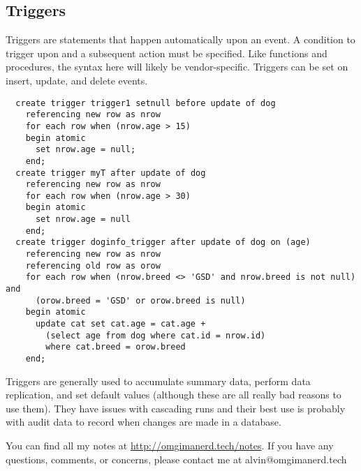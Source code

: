 \documentclass{math}
\begin{document}
\subsection*{Triggers}
Triggers are statements that happen automatically upon an event. A condition to
trigger upon and a subsequent action must be specified. Like functions and
procedures, the syntax here will likely be vendor-specific. Triggers can be set
on insert, update, and delete events.
\begin{lstlisting}
  create trigger trigger1 setnull before update of dog
    referencing new row as nrow
    for each row when (nrow.age > 15)
    begin atomic
      set nrow.age = null;
    end;
  create trigger myT after update of dog
    referencing new row as nrow
    for each row when (nrow.age > 30)
    begin atomic
      set nrow.age = null
    end;
  create trigger doginfo_trigger after update of dog on (age)
    referencing new row as nrow
    referencing old row as orow
    for each row when (nrow.breed <> 'GSD' and nrow.breed is not null) and
      (orow.breed = 'GSD' or orow.breed is null)
    begin atomic
      update cat set cat.age = cat.age +
        (select age from dog where cat.id = nrow.id)
        where cat.breed = orow.breed
    end;
\end{lstlisting}
Triggers are generally used to accumulate summary data, perform data
replication, and set default values (although these are all really bad reasons
to use them). They have issues with cascading runs and their best use is
probably with audit data to record when changes are made in a database.

\begin{center}
  You can find all my notes at \url{http://omgimanerd.tech/notes}. If you have
  any questions, comments, or concerns, please contact me at
  alvin@omgimanerd.tech
\end{center}
\end{document}

